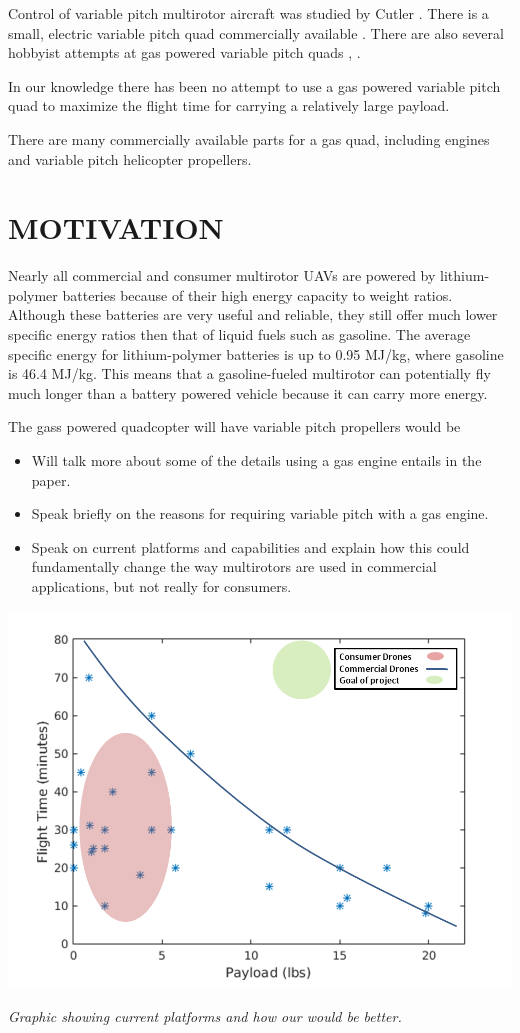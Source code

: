 \documentclass[letterpaper, 10 pt, conference]{ieeeconf}  %
\makeatletter
\newenvironment{figurehere}
  {\def\@captype{figure}}
  {}
\makeatother
\begin{document}
Control of variable pitch multirotor aircraft was studied by Cutler \cite{Cutler2012}. There is a small, electric variable pitch quad commercially available \cite{stingray2016}.  There are also several hobbyist attempts at gas powered variable pitch quads \cite{diy2016}, \cite{hackaday2016}.

In our knowledge there has been no attempt to use a gas powered variable pitch quad to maximize the flight time for carrying a relatively large payload. 

There are many commercially available parts for a gas quad, including engines and variable pitch helicopter propellers. 

\section{MOTIVATION}

Nearly all commercial and consumer multirotor UAVs are powered by lithium-polymer batteries because of their high energy capacity to weight ratios. Although these batteries are very useful and reliable, they still offer much lower specific energy ratios then that of liquid fuels such as gasoline. The average specific energy for lithium-polymer batteries is up to 0.95 MJ/kg, where gasoline is 46.4 MJ/kg. This means that a gasoline-fueled multirotor can potentially fly much longer than a battery powered vehicle because it can carry more energy.  

The gass powered quadcopter will have variable pitch propellers would be  
\begin{itemize}
	\item{Will talk more about some of the details using a gas engine entails in the paper.}
	\item{Speak briefly on the reasons for requiring variable pitch with a gas engine.} 
	\item{Speak on current platforms and capabilities and explain how this could fundamentally change the way multirotors are used in commercial applications, but not really for consumers.}
\end{itemize}


\begin{figurehere}
	\begin{center}
		\includegraphics[width=.40\textwidth]{current_capabilities.png}
		\caption{\textit{Graphic showing current platforms and how our would be better.}}
		\label{current_cap}
	\end{center}
\end{figurehere}
\end{document}
